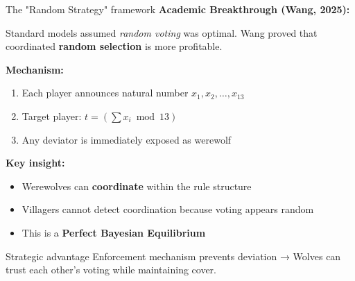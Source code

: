 \documentclass[10pt]{beamer}
\begin{document}
\begin{frame}{The "Random Strategy" framework}
  \textbf{Academic Breakthrough (Wang, 2025):}
  
  Standard models assumed \textit{random voting} was optimal. Wang proved that coordinated \textbf{random selection} is more profitable.

  \vspace{0.3cm}
  \textbf{Mechanism:}
  \begin{enumerate}
    \item Each player announces natural number $x_1, x_2, \ldots, x_{13}$
    \item Target player: $t = \left(\sum x_i \bmod 13\right)$
    \item Any deviator is immediately exposed as werewolf
  \end{enumerate}

  \vspace{0.3cm}
  \textbf{Key insight:}
  \begin{itemize}
    \item Werewolves can \textbf{coordinate} within the rule structure
    \item Villagers cannot detect coordination because voting appears random
    \item This is a \textbf{Perfect Bayesian Equilibrium}
  \end{itemize}

  \begin{alertblock}{Strategic advantage}
    Enforcement mechanism prevents deviation → Wolves can trust each other's voting while maintaining cover.
  \end{alertblock}
\end{frame}
\end{document}
